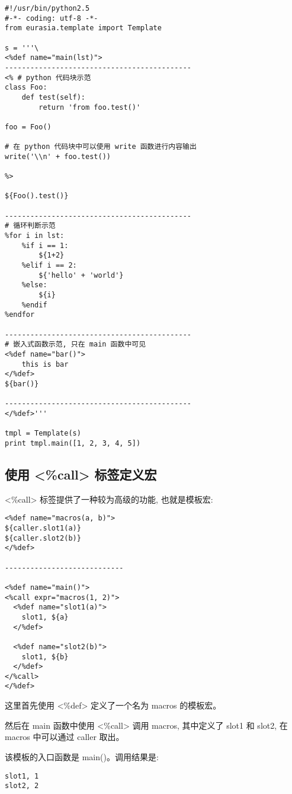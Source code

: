 \documentclass{manual}
\begin{document}
\begin{verbatim}
#!/usr/bin/python2.5
#-*- coding: utf-8 -*-
from eurasia.template import Template

s = '''\
<%def name="main(lst)">
--------------------------------------------
<% # python 代码块示范
class Foo:
	def test(self):
		return 'from foo.test()'

foo = Foo()

# 在 python 代码块中可以使用 write 函数进行内容输出
write('\\n' + foo.test())

%>

${Foo().test()}

--------------------------------------------
# 循环判断示范
%for i in lst:
	%if i == 1:
		${1+2}
	%elif i == 2:
		${'hello' + 'world'}
	%else:
		${i}
	%endif
%endfor

--------------------------------------------
# 嵌入式函数示范, 只在 main 函数中可见
<%def name="bar()">
	this is bar
</%def>
${bar()}

--------------------------------------------
</%def>'''

tmpl = Template(s)
print tmpl.main([1, 2, 3, 4, 5])
\end{verbatim}

\subsection{使用 <\%call> 标签定义宏}

<\%call> 标签提供了一种较为高级的功能, 也就是模板宏:

\begin{verbatim}
<%def name="macros(a, b)">
${caller.slot1(a)}
${caller.slot2(b)}
</%def>

----------------------------

<%def name="main()">
<%call expr="macros(1, 2)">
  <%def name="slot1(a)">
    slot1, ${a}
  </%def>

  <%def name="slot2(b)">
    slot1, ${b}
  </%def>
</%call>
</%def>
\end{verbatim}

这里首先使用 <\%def> 定义了一个名为 macros 的模板宏。

然后在 main 函数中使用 <\%call> 调用 macros, 其中定义了 slot1 和 slot2,
在 macros 中可以通过 caller 取出。

该模板的入口函数是 main()。调用结果是:

\begin{verbatim}
slot1, 1
slot2, 2
\end{verbatim}
\end{document}
